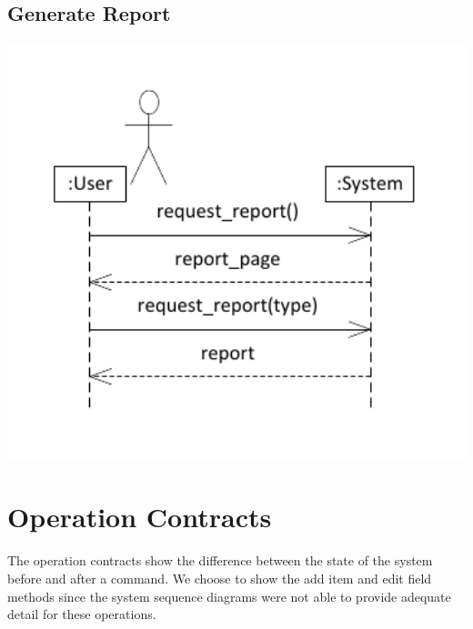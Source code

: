 \documentclass{article}
\begin{document}
\subsection{Generate Report}
\includegraphics[keepaspectratio, width=6in]{ssd_generate_report.pdf}\\

\section{Operation Contracts}
The operation contracts show the difference between the state of the system before and after a command.  We choose to show the add item and edit field methods since the system sequence diagrams were not able to provide adequate detail for these operations.
\end{document}
